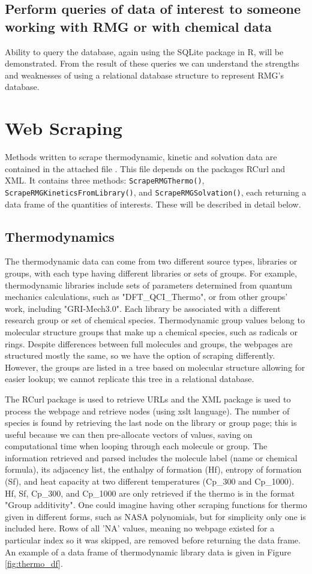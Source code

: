\documentclass[11pt]{article}
\begin{document}
\subsection{Perform queries of data of interest to someone working with RMG or with chemical data}
Ability to query the database, again using the SQLite package in R, will be demonstrated. From the result of these queries we can understand the strengths and weaknesses of using a relational database structure to represent RMG's database.

\section{Web Scraping}
Methods written to scrape thermodynamic, kinetic and solvation data are contained in the attached file . This file depends on the packages RCurl and XML. It contains three methods: \texttt{ScrapeRMGThermo()}, \texttt{ScrapeRMGKineticsFromLibrary()}, and \texttt{ScrapeRMGSolvation()}, each returning a data frame of the quantities of interests. These will be described in detail below.

\subsection{Thermodynamics}
The thermodynamic data can come from two different source types, libraries or groups, with each type having different libraries or sets of groups. For example, thermodynamic libraries include sets of parameters determined from quantum mechanics calculations, such as "DFT\_QCI\_Thermo", or from other groups' work, including "GRI-Mech3.0". Each library be associated with a different research group or set of chemical species. Thermodynamic group values belong to molecular structure groups that make up a chemical species, such as radicals or rings. Despite differences between full molecules and groups, the webpages are structured mostly the same, so we have the option of scraping differently. However, the groups are listed in a tree based on molecular structure allowing for easier lookup; we cannot replicate this tree in a relational database.

The RCurl package is used to retrieve URLs and the XML package is used to process the webpage and retrieve nodes (using xslt language). The number of species is found by retrieving the last node on the library or group page; this is useful because we can then pre-allocate vectors of values, saving on computational time when looping through each molecule or group. The information retrieved and parsed includes the molecule label (name or chemical formula), its adjacency list, the enthalpy of formation (Hf), entropy of formation (Sf), and heat capacity at two different temperatures (Cp\_300 and Cp\_1000). Hf, Sf, Cp\_300, and Cp\_1000 are only retrieved if the thermo is in the format "Group additivity". One could imagine having other scraping functions for thermo given in different forms, such as NASA polynomials, but for simplicity only one is included here. Rows of all 'NA' values, meaning no webpage existed for a particular index so it was skipped, are removed before returning the data frame. An example of a data frame of thermodynamic library data is given in Figure \ref{fig:thermo_df}.
\end{document}
